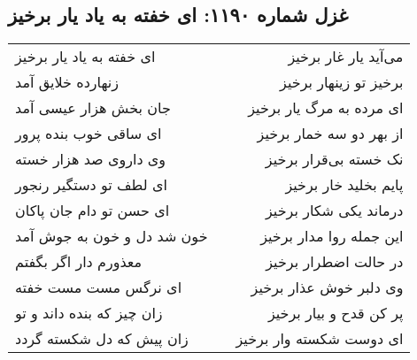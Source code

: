 \begin{center}
\section*{غزل شماره ۱۱۹۰: ای خفته به یاد یار برخیز}
\label{sec:1190}
\begin{longtable}{l p{0.5cm} r}
ای خفته به یاد یار برخیز
&&
می‌آید یار غار برخیز
\\
زنهارده خلایق آمد
&&
برخیز تو زینهار برخیز
\\
جان بخش هزار عیسی آمد
&&
ای مرده به مرگ یار برخیز
\\
ای ساقی خوب بنده پرور
&&
از بهر دو سه خمار برخیز
\\
وی داروی صد هزار خسته
&&
نک خسته بی‌قرار برخیز
\\
ای لطف تو دستگیر رنجور
&&
پایم بخلید خار برخیز
\\
ای حسن تو دام جان پاکان
&&
درماند یکی شکار برخیز
\\
خون شد دل و خون به جوش آمد
&&
این جمله روا مدار برخیز
\\
معذورم دار اگر بگفتم
&&
در حالت اضطرار برخیز
\\
ای نرگس مست مست خفته
&&
وی دلبر خوش عذار برخیز
\\
زان چیز که بنده داند و تو
&&
پر کن قدح و بیار برخیز
\\
زان پیش که دل شکسته گردد
&&
ای دوست شکسته وار برخیز
\\
\end{longtable}
\end{center}

